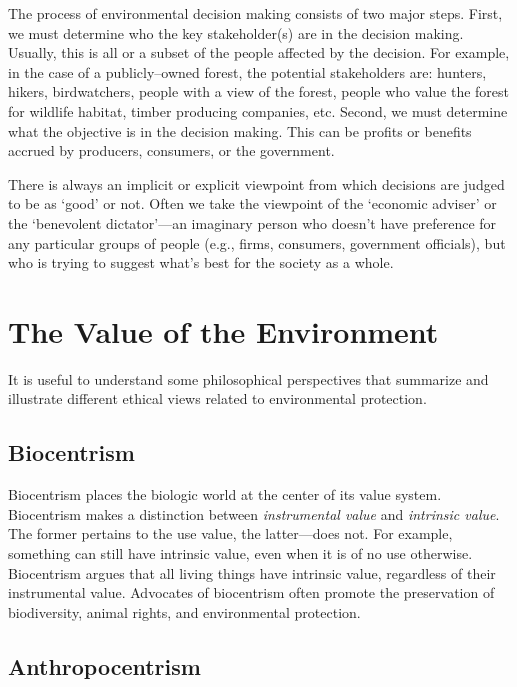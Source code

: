 \documentclass[
]{book}
\begin{document}
The process of environmental decision making consists of two major steps. First, we must determine who the key stakeholder(s) are in the decision making. Usually, this is all or a subset of the people affected by the decision. For example, in the case of a publicly--owned forest, the potential stakeholders are: hunters, hikers, birdwatchers, people with a view of the forest, people who value the forest for wildlife habitat, timber producing companies, etc. Second, we must determine what the objective is in the decision making. This can be profits or benefits accrued by producers, consumers, or the government.

There is always an implicit or explicit viewpoint from which decisions are judged to be as `good' or not. Often we take the viewpoint of the `economic adviser' or the `benevolent dictator'---an imaginary person who doesn't have preference for any particular groups of people (e.g., firms, consumers, government officials), but who is trying to suggest what's best for the society as a whole.

\hypertarget{the-value-of-the-environment}{%
\section{The Value of the Environment}\label{the-value-of-the-environment}}

It is useful to understand some philosophical perspectives that summarize and illustrate different ethical views related to environmental protection.

\hypertarget{biocentrism}{%
\subsection{Biocentrism}\label{biocentrism}}

Biocentrism places the biologic world at the center of its value system. Biocentrism makes a distinction between \emph{instrumental value} and \emph{intrinsic value}. The former pertains to the use value, the latter---does not. For example, something can still have intrinsic value, even when it is of no use otherwise. Biocentrism argues that all living things have intrinsic value, regardless of their instrumental value. Advocates of biocentrism often promote the preservation of biodiversity, animal rights, and environmental protection.

\hypertarget{anthropocentrism}{%
\subsection{Anthropocentrism}\label{anthropocentrism}}
\end{document}
